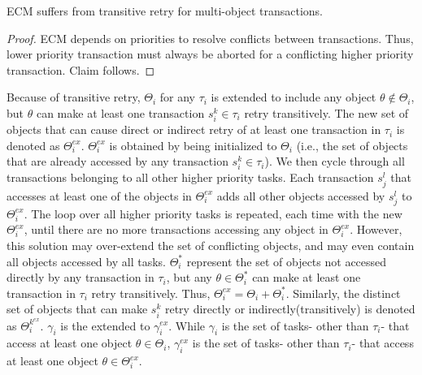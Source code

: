 \begin{clm}\label{ecm-rcm-transitive-retry}
ECM suffers from transitive retry for multi-object transactions.
\end{clm}
%
\begin{proof}\normalfont
%
ECM depends on priorities to resolve conflicts between transactions. Thus, lower priority transaction must always be aborted for a conflicting higher priority transaction. Claim follows.
%
\end{proof}
%
Because of transitive retry, $\Theta_i$ for any $\tau_i$ is extended to include any object $\theta \not \in \Theta_i$, but $\theta$ can make at least one transaction $s_i^k \in \tau_i$ retry transitively. The new set of objects that can cause direct or indirect retry of at least one transaction in $\tau_i$ is denoted as $\Theta_i^{ex}$. $\Theta_i^{ex}$ is obtained by being initialized to $\Theta_i$ (i.e., the set of objects that are already accessed by any transaction $s_i^k \in \tau_i$). We then cycle through all transactions belonging to all other higher priority tasks. Each transaction $s_j^l$ that accesses at least one of the objects in $\Theta_i^{ex}$ adds all other objects accessed by $s_j^l$ to $\Theta_i^{ex}$. The loop over all higher priority tasks is repeated, each time with the new $\Theta_i^{ex}$, until there are no more transactions accessing any object in $\Theta_i^{ex}$. However, this solution may over-extend the set of conflicting objects, and may even contain all objects accessed by all tasks. $\Theta_i^*$ represent the set of objects not accessed directly by any transaction in $\tau_i$, but any $\theta \in \Theta_i^*$ can make at least one transaction in $\tau_i$ retry transitively. Thus, $\Theta_i^{ex}=\Theta_i + \Theta_i^*$. Similarly, the distinct set of objects that can make $s_i^k$ retry directly or indirectly(transitively) is denoted as $\Theta_i^{k^{ex}}$. $\gamma_i$ is the extended to $\gamma_i^{ex}$. While $\gamma_i$ is the set of tasks- other than $\tau_i$- that access at least one object $\theta \in \Theta_i$, $\gamma_i^{ex}$ is the set of tasks- other than $\tau_i$- that access at least one object $\theta \in \Theta_i^{ex}$.
%
